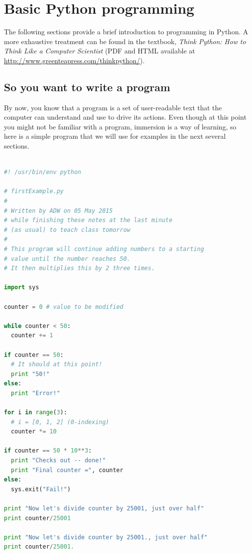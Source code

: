 \documentclass[a4paper,10pt]{scrartcl}
\begin{document}
\section{Basic Python programming}

The following sections provide a brief introduction to programming in Python. A more exhaustive treatment can be found in the textbook, \emph{Think Python: How to Think Like a Computer Scientist} (PDF and HTML available at \url{http://www.greenteapress.com/thinkpython/}).

\subsection{So you want to write a program}

By now, you know that a program is a set of user-readable text that the computer can understand and use to drive its actions. Even though at this point you might not be familiar with a program, immersion is a way of learning, so here is a simple program that we will use for examples in the next several sections.

\begin{lstlisting}[belowskip=-1.6\baselineskip, language=python]

#! /usr/bin/env python

# firstExample.py
# 
# Written by ADW on 05 May 2015
# while finishing these notes at the last minute
# (as usual) to teach class tomorrow
# 
# This program will continue adding numbers to a starting
# value until the number reaches 50.
# It then multiplies this by 2 three times.

import sys

counter = 0 # value to be modified

while counter < 50:
  counter += 1

if counter == 50:
  # It should at this point!
  print "50!"
else:
  print "Error!"
  
for i in range(3):
  # i = [0, 1, 2] (0-indexing)
  counter *= 10

if counter == 50 * 10**3:
  print "Checks out -- done!"
  print "Final counter =", counter
else:
  sys.exit("Fail!")
  
print "Now let's divide counter by 25001, just over half"
print counter/25001

print "Now let's divide counter by 25001., just over half"
print counter/25001.

\end{lstlisting}
\end{document}
